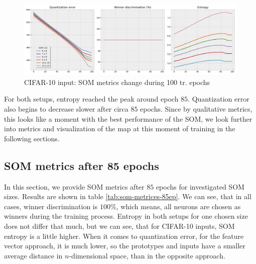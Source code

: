 \begin{figure}[h!]
    \centering
    \includegraphics[width=1\textwidth]{figs/cifar-som-measures.png}
    \caption{CIFAR-10 input: SOM metrics change during 100 tr. epochs}
    \label{fig:cifar-6n-99ep-stat}
\end{figure}


For both setups, entropy reached the peak around epoch $85$. Quantization error also begins to decrease slower after circa $85$ epochs. Since by qualitative metrics, this looks like a moment with the best performance of the SOM, we look further into metrics and visualization of the map at this moment of training in the following sections.

\subsection{SOM metrics after 85 epochs}

In this section, we provide SOM metrics after $85$ epochs for investigated SOM sizes. Results are shown in table \ref{tab:som-metrices-85ep}. We can see, that in all cases, winner discrimination is $100\%$, which means, all neurons are chosen as winners during the training process. Entropy in both setups for one chosen size does not differ that much, but we can see, that for CIFAR-10 inputs, SOM entropy is a little higher. When it comes to quantization error, for the feature vector approach, it is much lower, so the prototypes and inputs have a smaller average distance in $n$-dimensional space, than in the opposite approach. 

